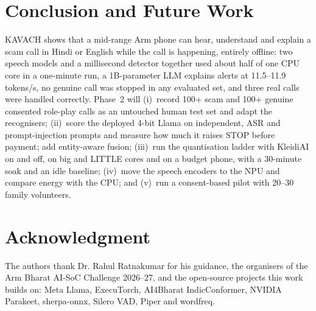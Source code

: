 \documentclass[conference]{IEEEtran}
\begin{document}
\section{Conclusion and Future Work}\label{sec:concl}
KAVACH shows that a mid-range Arm phone can hear, understand and explain a scam call in Hindi or English while the call is happening, entirely offline: two speech models and a millisecond detector together used about half of one CPU core in a one-minute run, a 1B-parameter LLM explains alerts at 11.5--11.9 tokens/s, no genuine call was stopped in any evaluated set, and three real calls were handled correctly. Phase~2 will (i)~record 100+ scam and 100+ genuine consented role-play calls as an untouched human test set and adapt the recognisers; (ii)~score the deployed 4-bit Llama on independent, ASR and prompt-injection prompts and measure how much it raises STOP before payment; add entity-aware fusion; (iii)~run the quantisation ladder with KleidiAI on and off, on big and LITTLE cores and on a budget phone, with a 30-minute soak and an idle baseline; (iv)~move the speech encoders to the NPU and compare energy with the CPU; and (v)~run a consent-based pilot with 20--30 family volunteers.

\section*{Acknowledgment}
The authors thank Dr. Rahul Ratnakumar for his guidance, the organisers of the Arm Bharat AI-SoC Challenge 2026--27, and the open-source projects this work builds on: Meta Llama, ExecuTorch, AI4Bharat IndicConformer, NVIDIA Parakeet, sherpa-onnx, Silero VAD, Piper and wordfreq.
\end{document}
